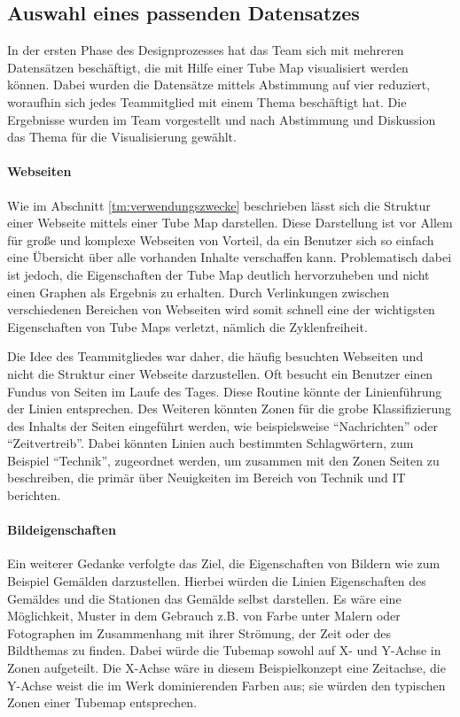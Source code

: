 \subsection{Auswahl eines passenden Datensatzes}
In der ersten Phase des Designprozesses hat das Team sich mit mehreren Datensätzen beschäftigt, die mit Hilfe einer Tube Map visualisiert werden können. Dabei wurden die Datensätze mittels Abstimmung auf vier reduziert, woraufhin sich jedes Teammitglied mit einem Thema beschäftigt hat. Die Ergebnisse wurden im Team vorgestellt und nach Abstimmung und Diskussion das Thema für die Visualisierung gewählt.

\paragraph{Webseiten}
Wie im Abschnitt \ref{tm:verwendungszwecke} beschrieben lässt sich die Struktur einer Webseite mittels einer Tube Map darstellen.  Diese Darstellung ist vor Allem für große und komplexe Webseiten von Vorteil, da ein Benutzer sich so einfach eine Übersicht über alle vorhanden Inhalte verschaffen kann. Problematisch dabei ist jedoch, die Eigenschaften der Tube Map deutlich hervorzuheben und nicht einen Graphen als Ergebnis zu erhalten. Durch Verlinkungen zwischen verschiedenen Bereichen von Webseiten wird somit schnell eine der wichtigsten Eigenschaften von Tube Maps verletzt, nämlich die Zyklenfreiheit.

Die Idee des Teammitgliedes war daher, die häufig besuchten Webseiten und nicht die Struktur einer Webseite darzustellen. Oft besucht ein Benutzer einen Fundus von Seiten im Laufe des Tages. Diese Routine könnte der Linienführung der Linien entsprechen. Des Weiteren könnten Zonen für die grobe Klassifizierung des Inhalts der Seiten eingeführt werden, wie beispielsweise "`Nachrichten"' oder "`Zeitvertreib"'. Dabei könnten Linien auch bestimmten Schlagwörtern, zum Beispiel "`Technik"', zugeordnet werden, um zusammen mit den Zonen Seiten zu beschreiben, die primär über Neuigkeiten im Bereich von Technik und IT berichten. 

\paragraph{Bildeigenschaften}
Ein weiterer Gedanke verfolgte das Ziel, die Eigenschaften von Bildern wie zum Beispiel Gemälden darzustellen. Hierbei würden die Linien Eigenschaften des Gemäldes und die Stationen das Gemälde selbst darstellen. Es wäre eine Möglichkeit, Muster in dem Gebrauch z.B. von Farbe unter Malern oder Fotographen im Zusammenhang mit ihrer Strömung, der Zeit oder des Bildthemas zu finden. Dabei würde die Tubemap sowohl auf X- und Y-Achse in Zonen aufgeteilt. Die X-Achse wäre in diesem Beispielkonzept eine Zeitachse, die Y-Achse weist die im Werk dominierenden Farben aus; sie würden den typischen Zonen einer Tubemap entsprechen.

